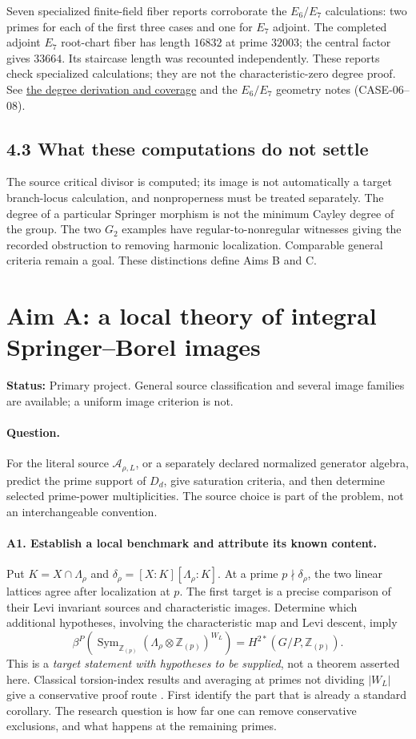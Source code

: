 \documentclass[11pt,letterpaper]{article}
\newcommand{\Z}{\mathbb Z}
\newcommand{\Sym}{\operatorname{Sym}}
\newcommand{\repo}{https://github.com/sean-rogers-t/Sage-programs/blob/e9fcb7f3b7d28bea9c248abab1f01d8de28250aa/}
\newcommand{\record}[2]{\href{\repo#1}{#2}}
\newcommand{\status}[1]{\noindent\textbf{Status:} #1\par}
\begin{document}
Seven specialized finite-field fiber reports corroborate the \(E_6/E_7\)
calculations: two primes for each of the first three cases and one for
\(E_7\) adjoint. The completed adjoint \(E_7\) root-chart fiber has length
\(16832\) at prime \(32003\); the central factor gives \(33664\).
Its staircase length was recounted independently. These reports check
specialized calculations; they are not the characteristic-zero degree proof.
See \record{borel/EXCEPTIONAL_DEGREES.md}{the degree derivation and coverage}
and the \(E_6/E_7\) geometry notes (CASE-06--08).

\subsection*{4.3 What these computations do not settle}
The source critical divisor is computed; its image is not automatically
a target branch-locus calculation, and nonproperness must be treated
separately. The degree of a particular Springer morphism is not the
minimum Cayley degree of the group. The two \(G_2\) examples have
regular-to-nonregular witnesses giving the recorded obstruction to
removing harmonic localization. Comparable general criteria remain a goal.
These distinctions define Aims B and C.

\newpage
\section{Aim A: a local theory of integral Springer--Borel images}
\status{Primary project. General source classification and several image
families are available; a uniform image criterion is not.}

\paragraph{Question.}
For the literal source \(\mathcal A_{\rho,L}\), or a separately declared
normalized generator algebra, predict the prime support of \(D_d\), give
saturation criteria, and then determine selected prime-power multiplicities.
The source choice is part of the problem, not an interchangeable convention.

\paragraph{A1. Establish a local benchmark and attribute its known content.}
Put \(K=X\cap\Lambda_\rho\) and
\(\delta_\rho=[X:K][\Lambda_\rho:K]\).
At a prime \(p\nmid\delta_\rho\), the two linear lattices agree after
localization at \(p\). The first target is a precise comparison of their Levi
invariant sources and characteristic images. Determine which additional
hypotheses, involving the characteristic map and Levi descent, imply
\[
 \beta^P\!\left(\Sym_{\Z_{(p)}}(\Lambda_\rho\otimes\Z_{(p)})^{W_L}\right)
       =H^{2*}(G/P,\Z_{(p)}).
\]
This is a \emph{target statement with hypotheses to be supplied}, not a
theorem asserted here. Classical torsion-index results and averaging at
primes not dividing \(|W_L|\) give a conservative proof route
\cite{CPZ}. First identify the part that is already a standard corollary.
The research question is how far one can remove conservative exclusions,
and what happens at the remaining primes.
\end{document}
